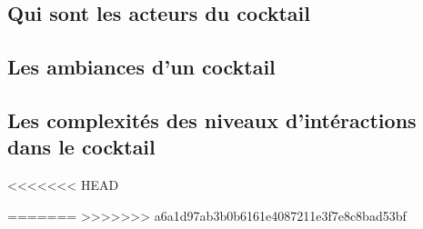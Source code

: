 


\subsection{Qui sont les acteurs du cocktail}


\subsection{Les ambiances d'un cocktail}




\subsection{Les complexités des niveaux d'intéractions dans le cocktail}
<<<<<<< HEAD



=======
>>>>>>> a6a1d97ab3b0b6161e4087211e3f7e8c8bad53bf
